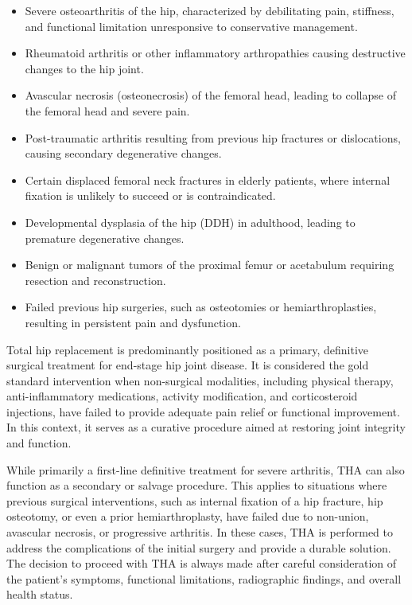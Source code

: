 \begin{itemize}
  \item Severe osteoarthritis of the hip, characterized by debilitating pain, stiffness, and functional limitation unresponsive to conservative management.
  \item Rheumatoid arthritis or other inflammatory arthropathies causing destructive changes to the hip joint.
  \item Avascular necrosis (osteonecrosis) of the femoral head, leading to collapse of the femoral head and severe pain.
  \item Post-traumatic arthritis resulting from previous hip fractures or dislocations, causing secondary degenerative changes.
  \item Certain displaced femoral neck fractures in elderly patients, where internal fixation is unlikely to succeed or is contraindicated.
  \item Developmental dysplasia of the hip (DDH) in adulthood, leading to premature degenerative changes.
  \item Benign or malignant tumors of the proximal femur or acetabulum requiring resection and reconstruction.
  \item Failed previous hip surgeries, such as osteotomies or hemiarthroplasties, resulting in persistent pain and dysfunction.
\end{itemize}

Total hip replacement is predominantly positioned as a primary, definitive surgical treatment for end-stage hip joint disease. It is considered the gold standard intervention when non-surgical modalities, including physical therapy, anti-inflammatory medications, activity modification, and corticosteroid injections, have failed to provide adequate pain relief or functional improvement. In this context, it serves as a curative procedure aimed at restoring joint integrity and function.

While primarily a first-line definitive treatment for severe arthritis, THA can also function as a secondary or salvage procedure. This applies to situations where previous surgical interventions, such as internal fixation of a hip fracture, hip osteotomy, or even a prior hemiarthroplasty, have failed due to non-union, avascular necrosis, or progressive arthritis. In these cases, THA is performed to address the complications of the initial surgery and provide a durable solution. The decision to proceed with THA is always made after careful consideration of the patient's symptoms, functional limitations, radiographic findings, and overall health status.

